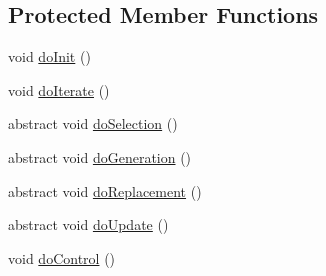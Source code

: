\subsection*{Protected Member Functions}
\begin{DoxyCompactItemize}
\item 
void \hyperlink{classnet_1_1sf_1_1jclec_1_1algorithm_1_1_population_algorithm_a12d1220c7c348e50a2df1abe1372b710}{do\-Init} ()
\item 
void \hyperlink{classnet_1_1sf_1_1jclec_1_1algorithm_1_1_population_algorithm_ab5d1f94dc78fdfb100cf00d326fd59d5}{do\-Iterate} ()
\item 
abstract void \hyperlink{classnet_1_1sf_1_1jclec_1_1algorithm_1_1_population_algorithm_a0c3b482671dc8c454f968a30a374c3be}{do\-Selection} ()
\item 
abstract void \hyperlink{classnet_1_1sf_1_1jclec_1_1algorithm_1_1_population_algorithm_a04894ec2d7f9e72eca1a41127bd1c7d3}{do\-Generation} ()
\item 
abstract void \hyperlink{classnet_1_1sf_1_1jclec_1_1algorithm_1_1_population_algorithm_afac7f83430707d572fbe8a2ea79c3685}{do\-Replacement} ()
\item 
abstract void \hyperlink{classnet_1_1sf_1_1jclec_1_1algorithm_1_1_population_algorithm_a0817186f210c38255cc46f490cbbf53e}{do\-Update} ()
\item 
void \hyperlink{classnet_1_1sf_1_1jclec_1_1algorithm_1_1_population_algorithm_ae084912845a8ee54c7a54fd168919cf6}{do\-Control} ()
\end{DoxyCompactItemize}
